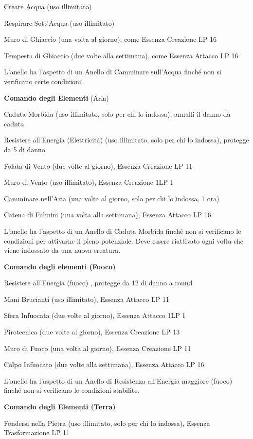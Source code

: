 \documentclass[a4paper,11pt,twoside,openany]{book}
\begin{document}
{Creare Acqua (uso illimitato)

Respirare Sott'Acqua (uso illimitato)

Muro di Ghiaccio (una volta al giorno), come Essenza Creazione LP 16

Tempesta di Ghiaccio (due volte alla settimana), come Essenza Attacco LP 16

L'anello ha l'aspetto di un Anello di Camminare sull'Acqua finché non si verificano certe condizioni.

\textbf{Comando degli Elementi} (Aria)

Caduta Morbida (uso illimitato, solo per chi lo indossa), annulli il danno da caduta

Resistere all'Energia (Elettricità) (uso illimitato, solo per chi lo indossa), protegge da 5 di danno

Folata di Vento (due volte al giorno), Essenza Creazione LP 11

Muro di Vento (uso illimitato), Essenza Creazione 1LP 1

Camminare nell'Aria (una volta al giorno, solo per chi lo indossa, 1 ora)

Catena di Fulmini (una volta alla settimana), Essenza Attacco LP 16

L'anello ha l'aspetto di un Anello di Caduta Morbida finché non si verificano le condizioni per attivarne il pieno potenziale. Deve essere riattivato ogni volta che viene indossato da una nuova creatura. 

\textbf{Comando degli elementi (Fuoco)}

Resistere all'Energia (fuoco) , protegge da 12 di danno a round

Mani Brucianti (uso illimitato), Essenza Attacco LP 11

Sfera Infuocata (due volte al giorno), Essenza Attacco 1LP 1

Pirotecnica (due volte al giorno), Essenza Creazione LP 13

Muro di Fuoco (una volta al giorno), Essenza Creazione LP 11

Colpo Infuocato (due volte alla settimana), Essenza Attacco LP 16

L'anello ha l'aspetto di un Anello di Resistenza all'Energia maggiore (fuoco) finché non si verificano le condizioni stabilite.

\textbf{Comando degli Elementi (Terra)}

Fondersi nella Pietra (uso illimitato, solo per chi lo indossa), Essenza Trasformazione LP 11

}
\end{document}
